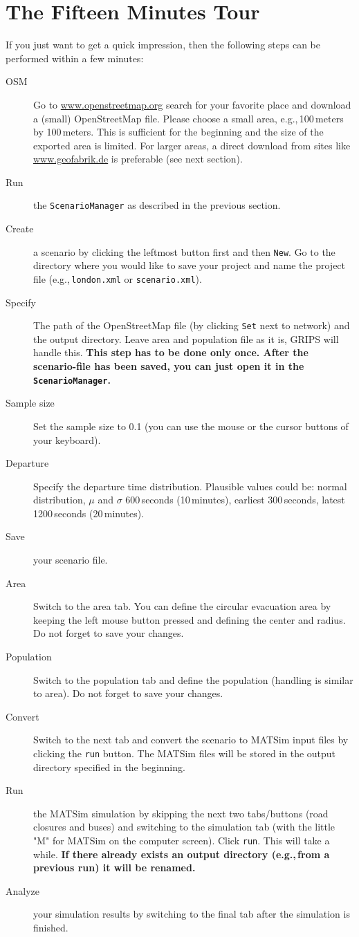\section{The Fifteen Minutes Tour}
\label{evac:section:fifteenminute}
If you just want to get a quick impression, then the following steps can be performed within a few minutes:
\begin{description}
\item[OSM] Go to \url{www.openstreetmap.org} search for your favorite place and download a (small) OpenStreetMap file. Please choose a small area, e.g.,\,100\,meters by 100\,meters. This is sufficient for the beginning and the size of the exported area is limited. For larger areas, a direct download from sites like \url{www.geofabrik.de} is preferable (see next section).
\item[Run] the \lstinline|ScenarioManager| as described in the previous section.
\item[Create] a scenario by clicking the leftmost button first and then \lstinline|New|. Go to the directory where you would like to save your project and name the project file (e.g.,\,\lstinline|london.xml| or \lstinline|scenario.xml|).
\item[Specify] The path of the OpenStreetMap file (by clicking \lstinline|Set| next to network) and the output directory. Leave area and population file as it is, GRIPS will handle this.
\textbf{This step has to be done only once. After the scenario-file has been saved, you can just open it in the \lstinline|ScenarioManager|.}
\item[Sample size] Set the sample size to 0.1 (you can use the mouse or the cursor buttons of your keyboard).
\item[Departure] Specify the departure time distribution. Plausible values could be: normal distribution, $\mu$ and $\sigma$ 600\,seconds (10\,minutes), earliest 300\,seconds, latest 1200\,seconds (20\,minutes).
\item[Save] your scenario file.
\item[Area] Switch to the area tab. You can define the circular evacuation area by keeping the left mouse button pressed and defining the center and radius. Do not forget to save your changes.
\item[Population] Switch to the population tab and define the population (handling is similar to area). Do not forget to save your changes.
\item[Convert] Switch to the next tab and convert the scenario to MATSim input files by clicking the \lstinline|run| button. The MATSim files will be stored in the output directory specified in the beginning.
\item[Run] the MATSim simulation by skipping the next two tabs/buttons (road closures and buses) and switching to the simulation tab (with the little "M" for MATSim on the computer screen). Click \lstinline|run|. This will take a while.
\textbf{If there already exists an output directory (e.g.,\,from a previous run) it will be renamed.}
\item[Analyze] your simulation results by switching to the final tab after the simulation is finished.

\end{description}

